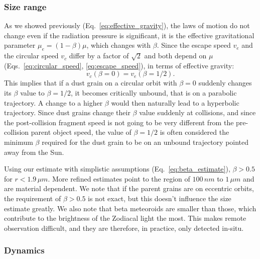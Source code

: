 \subsubsection{Size range}

As we showed previously (Eq.~\ref{eq:effective_gravity}), the laws of motion do not change even if the radiation pressure is significant, it is the effective gravitational parameter $\mu_{e} = (1-\beta) \mu$, which changes with $\beta$. Since the escape speed $v_e$ and the circular speed $v_c$ differ by a factor of $\sqrt{2}$ and both depend on $\mu$ (Eqs.~\ref{eq:circular_speed}, \ref{eq:escape_speed}), in terms of effective gravity:
\begin{equation}
    v_c(\beta=0) = v_e(\beta=1/2).
\end{equation}
This implies that if a dust grain on a circular orbit with $\beta=0$ suddenly changes its $\beta$ value to $\beta = 1/2$, it becomes critically unbound, that is on a parabolic trajectory. A change to a higher $\beta$ would then naturally lead to a hyperbolic trajectory. Since dust grains change their $\beta$ value suddenly at collisions, and since the post-collision fragment speed is not going to be very different from the pre-collision parent object speed, the value of $\beta=1/2$ is often considered the minimum $\beta$ required for the dust grain to be on an unbound trajectory pointed away from the Sun.

Using our estimate with simplistic assumptions (Eq.~\ref{eq:beta_estimate}), $\beta > 0.5$ for $r < 1.9 \, \si{\mu m}$. More refined estimates \citep{kimura2003composition} point to the region of $100 \, \si{nm}$ to $1 \, \si{\mu m}$ and are material dependent. We note that if the parent grains are on eccentric orbits, the requirement of $\beta > 0.5$ is not exact, but this doesn't influence the size estimate greatly. We also note that beta meteoroids are smaller than those, which contribute to the brightness of the Zodiacal light the most. This makes remote observation difficult, and they are therefore, in practice, only detected in-situ.

\subsubsection{Dynamics}

